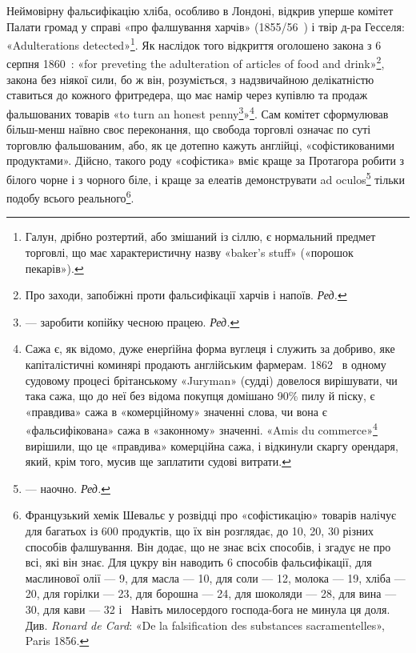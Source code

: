 Неймовірну фальсифікацію хліба, особливо в Лондоні, відкрив
уперше комітет Палати громад у справі «про фалшування
харчів» (1855/56~) і твір д-ра Гесселя: «Adulterations
detected»\footnote{
Галун, дрібно розтертий, або змішаний із сіллю, є нормальний
предмет торговлі, що має характеристичну назву «baker’s stuff» («порошок
пекарів»).
}. Як наслідок того відкриття оголошено закона з 6 серпня
1860~: «for preveting the adulteration of articles of food
and drink»\footnote*{
Про заходи, запобіжні проти фальсифікації харчів і напоїв. \emph{Ред.}
}, закона без ніякої сили, бо ж він, розуміється, з
надзвичайною делікатністю ставиться до кожного фритредера,
що має намір через купівлю та продаж фальшованих товарів «to
turn an honest penny\footnote*{
— заробити копійку чесною працею. \emph{Ред.}
}»\footnote{
Сажа є, як відомо, дуже енерґійна форма вуглеця і служить за
добриво, яке капіталістичні коминярі продають англійським фармерам.
1862~ в одному судовому процесі брітанському «Juryman» (судді) довелося
вирішувати, чи така сажа, що до неї без відома покупця домішано
90\% пилу й піску, є «правдива» сажа в «комерційному» значенні слова,
чи вона є «фальсифікована» сажа в «законному» значенні. «Amis du
commerce»\footnote*{
Друзі торговлі. \emph{Ред.}
} вирішили, що це «правдива» комерційна сажа, і відкинули
скаргу орендаря, який, крім того, мусив ще заплатити судові витрати.
}. Сам комітет сформулював більш-менш
наївно своє переконання, що свобода торговлі означає по суті
торговлю фальшованим, або, як це дотепно кажуть англійці, «софістикованими
продуктами». Дійсно, такого роду «софістика»
вміє краще за Протагора робити з білого чорне і з чорного біле,
і краще за елеатів демонструвати ad oculos\footnote*{
— наочно. \emph{Ред.}
} тільки подобу всього
реального\footnote{
Французький хемік Шевальє у розвідці про «софістикацію» товарів
налічує для багатьох із 600 продуктів, що їх він розглядає, до 10, 20,
30 різних способів фалшування. Він додає, що не знає всіх способів, і
згадує не про всі, які він знає. Для цукру він наводить 6 способів фальсифікації,
для маслинової олії — 9, для масла — 10, для соли — 12, молока
— 19, хліба — 20, для горілки — 23, для борошна — 24, для шоколяди
— 28, для вина — 30, для кави — 32 і~ Навіть милосердого господа-бога
не минула ця доля. Див. \emph{Ronard de Card}: «De la falsification
des substances sacramentelles», Paris 1856.
}.

